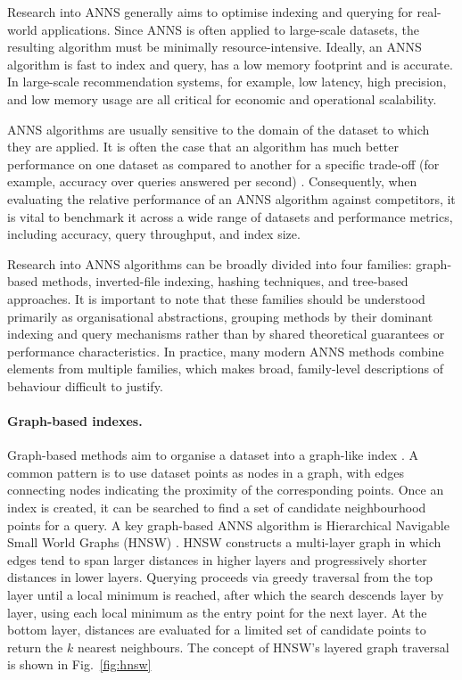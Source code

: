 \documentclass{article}
\begin{document}
Research into ANNS generally aims to optimise indexing and querying for real-world applications. Since ANNS is often applied to large-scale datasets, the resulting algorithm must be minimally resource-intensive. Ideally, an ANNS algorithm is fast to index and query, has a low memory footprint and is accurate. In large-scale recommendation systems, for example, low latency, high precision, and low memory usage are all critical for economic and operational scalability.

ANNS algorithms are usually sensitive to the domain of the dataset to which they are applied. It is often the case that an algorithm has much better performance on one dataset as compared to another for a specific trade-off (for example, accuracy over queries answered per second) \cite{jaasaari2025vibe,aumuller2020ann}. Consequently, when evaluating the relative performance of an ANNS algorithm against competitors, it is vital to benchmark it across a wide range of datasets and performance metrics, including accuracy, query throughput, and index size.

Research into ANNS algorithms can be broadly divided into four families: graph-based methods, inverted-file indexing, hashing techniques, and tree-based approaches. It is important to note that these families should be understood primarily as organisational abstractions, grouping methods by their dominant indexing and query mechanisms rather than by shared theoretical guarantees or performance characteristics. In practice, many modern ANNS methods combine elements from multiple families, which makes broad, family-level descriptions of behaviour difficult to justify.

\paragraph{Graph-based indexes.}

Graph-based methods aim to organise a dataset into a graph-like index \cite{wang2021comprehensive,harwood2016fanng,fu2017fast,malkov2018efficient}. A common pattern is to use dataset points as nodes in a graph, with edges connecting nodes indicating the proximity of the corresponding points. Once an index is created, it can be searched to find a set of candidate neighbourhood points for a query. A key graph-based ANNS algorithm is Hierarchical Navigable Small World Graphs (HNSW) \cite{malkov2018efficient}. HNSW constructs a multi-layer graph in which edges tend to span larger distances in higher layers and progressively shorter distances in lower layers. Querying proceeds via greedy traversal from the top layer until a local minimum is reached, after which the search descends layer by layer, using each local minimum as the entry point for the next layer. At the bottom layer, distances are evaluated for a limited set of candidate points to return the $k$ nearest neighbours. The concept of HNSW's layered graph traversal is shown in Fig.~\ref{fig:hnsw}
\end{document}

